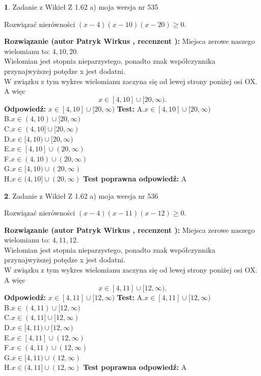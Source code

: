 \documentclass[12pt, a4paper]{article}
\theoremstyle{definition} %
\newtheorem{zad}{}
\newcommand{\zadStart}[1]{\begin{zad}#1\newline}
\newcommand{\zadStop}{\end{zad}}
\newcommand{\rozwStart}[2]{\noindent \textbf{Rozwiązanie (autor #1 , recenzent #2): }\newline}
\newcommand{\rozwStop}{\newline}
\newcommand{\odpStart}{\noindent \textbf{Odpowiedź:}\newline}
\newcommand{\odpStop}{\newline}
\newcommand{\testStart}{\noindent \textbf{Test:}\newline}
\newcommand{\testStop}{\newline}
\newcommand{\kluczStart}{\noindent \textbf{Test poprawna odpowiedź:}\newline}
\newcommand{\kluczStop}{\newline}
\begin{document}
\zadStart{Zadanie z Wikieł Z 1.62 a) moja wersja nr 535}

Rozwiązać nierówności $(x-4)(x-10)(x-20)\ge0$.
\zadStop
\rozwStart{Patryk Wirkus}{}
Miejsca zerowe naszego wielomianu to: $4, 10, 20$.\\
Wielomian jest stopnia nieparzystego, ponadto znak współczynnika przy\linebreak najwyższej potędze x jest dodatni.\\ W związku z tym wykres wielomianu zaczyna się od lewej strony poniżej osi OX. A więc $$x \in [4,10] \cup [20,\infty).$$
\rozwStop
\odpStart
$x \in [4,10] \cup [20,\infty)$
\odpStop
\testStart
A.$x \in [4,10] \cup [20,\infty)$\\
B.$x \in (4,10) \cup [20,\infty)$\\
C.$x \in (4,10] \cup [20,\infty)$\\
D.$x \in [4,10) \cup [20,\infty)$\\
E.$x \in [4,10] \cup (20,\infty)$\\
F.$x \in (4,10) \cup (20,\infty)$\\
G.$x \in [4,10) \cup (20,\infty)$\\
H.$x \in (4,10] \cup (20,\infty)$
\testStop
\kluczStart
A
\kluczStop



\zadStart{Zadanie z Wikieł Z 1.62 a) moja wersja nr 536}

Rozwiązać nierówności $(x-4)(x-11)(x-12)\ge0$.
\zadStop
\rozwStart{Patryk Wirkus}{}
Miejsca zerowe naszego wielomianu to: $4, 11, 12$.\\
Wielomian jest stopnia nieparzystego, ponadto znak współczynnika przy\linebreak najwyższej potędze x jest dodatni.\\ W związku z tym wykres wielomianu zaczyna się od lewej strony poniżej osi OX. A więc $$x \in [4,11] \cup [12,\infty).$$
\rozwStop
\odpStart
$x \in [4,11] \cup [12,\infty)$
\odpStop
\testStart
A.$x \in [4,11] \cup [12,\infty)$\\
B.$x \in (4,11) \cup [12,\infty)$\\
C.$x \in (4,11] \cup [12,\infty)$\\
D.$x \in [4,11) \cup [12,\infty)$\\
E.$x \in [4,11] \cup (12,\infty)$\\
F.$x \in (4,11) \cup (12,\infty)$\\
G.$x \in [4,11) \cup (12,\infty)$\\
H.$x \in (4,11] \cup (12,\infty)$
\testStop
\kluczStart
A
\kluczStop
\end{document}
